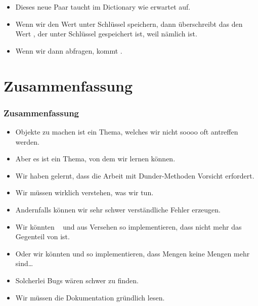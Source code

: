 \documentclass[aspectratio=169,mathserif,notheorems]{beamer}%
\begin{document}
\begin{frame}[t]
{{\begin{itemize}
{}%
%
%
%
\item<16-> Dieses neue Paar taucht im Dictionary wie erwartet auf.%
%
\item<17-> Wenn wir den Wert  unter Schlüssel  speichern, dann überschreibt das den Wert , der unter Schlüssel  gespeichert ist, weil  nämlich  ist.%
%
\item<18-> Wenn wir dann  abfragen, kommt .%
\end{itemize}%
}}%
%
%
%
%
\end{frame}%
%
\section{Zusammenfassung}%
%
\begin{frame}[t]%
\frametitle{Zusammenfassung}%
%
\begin{itemize}%
\item Objekte  zu machen ist ein Thema, welches wir nicht soooo oft antreffen werden.%
%
\item<2-> Aber es ist ein Thema, von dem wir lernen können.%
%
\item<3-> Wir haben gelernt, dass die Arbeit mit Dunder-Methoden Vorsicht erfordert.%
%
\item<4-> Wir müssen wirklich verstehen, was wir tun.%
%
\item<5-> Andernfalls können wir sehr schwer verständliche Fehler erzeugen.%
%
\item<6-> Wir könnten \DEzB\  und  aus Versehen so implementieren, dass  nicht mehr das Gegenteil von  ist.%
%
\item<7-> Oder wir könnten  und  so implementieren, dass Mengen keine Mengen mehr sind\dots%
%
\item<8-> Solcherlei Bugs wären schwer zu finden.%
%
\item<9-> Wir müssen die Dokumentation gründlich lesen.%
\end{itemize}%
\end{frame}%
%
\endPresentation%
\end{document}
